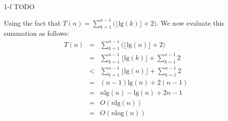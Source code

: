 \documentclass[11pt]{article}
\newcommand{\tlg}{\text{lg}}
\newcommand{\tlog}{\text{log}}
\begin{document}
\begin{prob}{1-f}
TODO
\end{prob}
\begin{sol}
Using the fact that $T(n) = \sum_{k=1}^{n-1}\big(\Big\lfloor\tlg(k)\Big\rfloor + 2\big)$. We now evaluate this summation as follows:
\begin{eqnarray*}
T(n) & = & \sum_{k=1}^{n-1}\big(\Big\lfloor\tlg(n)\Big\rfloor + 2\big) \\ 
& = & \sum_{k=1}^{n-1}\Big\lfloor\tlg(k)\Big\rfloor + \sum_{k=1}^{n-1}2 \\
& < & \sum_{k=1}^{n-1}\Big\lfloor\tlg(n)\Big\rfloor + \sum_{k=1}^{n-1}2 \\
& = & (n-1)\tlg(n) + 2(n-1) \\
& = & n\tlg(n) - \tlg(n) + 2n - 1 \\
& = & O(n\tlg(n)) \\
& = & O(n\tlog(n))
\end{eqnarray*}
\end{sol}
\end{document}
